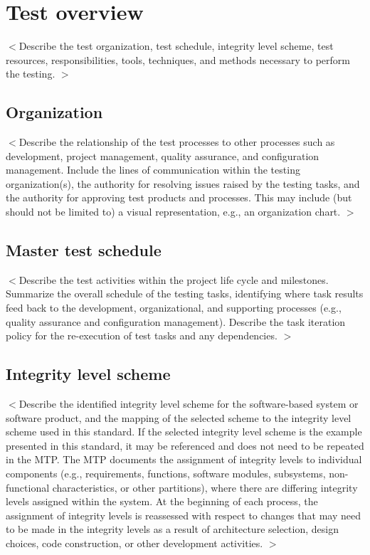 \documentclass{scrreprt}
\begin{document}
\section{Test overview}
$<$Describe the test organization, test schedule, integrity level scheme, test resources, responsibilities, tools, techniques, and methods necessary to perform the testing. $>$

\subsection{Organization}
$<$Describe the relationship of the test processes to other processes such as development, project
management, quality assurance, and configuration management. Include the lines of communication
within the testing organization(s), the authority for resolving issues raised by the testing tasks, and the authority for approving test products and processes. This may include (but should not be limited to) a visual representation, e.g., an organization chart. $>$

\subsection{Master test schedule}
$<$Describe the test activities within the project life cycle and milestones. Summarize the overall schedule of the testing tasks, identifying where task results feed back to the development, organizational, and supporting processes (e.g., quality assurance and configuration management). Describe the task iteration policy for the re-execution of test tasks and any dependencies. $>$

\subsection{Integrity level scheme}
$<$Describe the identified integrity level scheme for the software-based system or software product, and the mapping of the selected scheme to the integrity level scheme used in this standard. If the selected integrity level scheme is the example presented in this standard, it may be referenced and does not need to be repeated in the MTP. The MTP documents the assignment of integrity levels to individual components (e.g., requirements, functions, software modules, subsystems, non-functional characteristics, or other partitions), where there are differing integrity levels assigned within the system. At the beginning of each process, the assignment of integrity levels is reassessed with respect to changes that may need to be made in the integrity levels as a result of architecture selection, design choices, code construction, or other development activities. $>$
\end{document}
